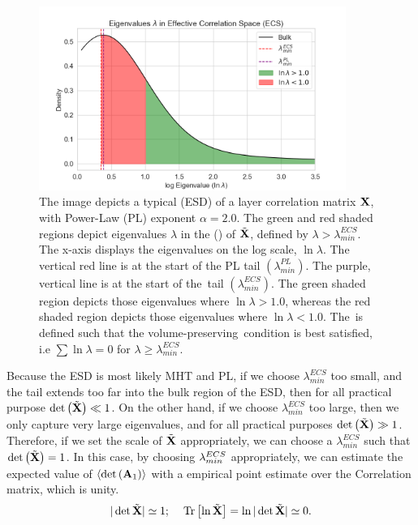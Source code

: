 \begin{figure}[t]
  \begin{center}
  \includegraphics[width=10cm]{./img/ECS_space.png}
  \caption{The image depicts a typical
    \EmpiricalSpectralDensity (ESD) of a layer correlation matrix $\mathbf{X}$, with \WW Power-Law (PL) exponent
    $\alpha=2.0$.%
    The green and red shaded regions depict
    eigenvalues $\lambda$ in the \EffectiveCorrelationSpace (\ECS) of $\tilde{\mathbf{X}}$, defined by $\lambda>\lambda_{min}^{ECS}$.
    The x-axis displays the eigenvalues on the log scale, $\ln\lambda$.
    The vertical red line is at the start of the PL tail  $(\lambda_{min}^{PL})$.
    The purple, vertical line is at the start of the~\ECS tail  $(\lambda_{min}^{ECS})$.
    The green shaded region depicts those eigenvalues where $\ln\lambda>1.0$,
    whereas the red shaded region depicts those eigenvalues where $\ln\lambda<1.0$.
    The~\ECS is defined such that the volume-preserving~\TRACELOG condition is best satisfied, i.e $\sum\ln\lambda= 0$ for $\lambda\ge\lambda_{min}^{ECS}$.
    }
  \end{center}
  \label{fig:ECS_space}
\end{figure}

Because the \Teacher ESD is most likely MHT and PL, 
if we choose $\lambda_{min}^{ECS}$ too small, and the tail extends too far into the bulk region of the ESD,
then for all practical purpose $\mbox{}{\text{det}}\left(\tilde{\mathbf{X}}\right)\ll 1$.
On the other hand, if we choose $\lambda_{min}^{ECS}$ too large,
then we only capture very large eigenvalues, and for all practical purposes $\mbox{}{\text{det}}\left(\tilde{\mathbf{X}}\right) \gg 1$.
Therefore, if we set the scale of $\tilde{\mathbf{X}}$ appropriately, we can choose a $\lambda_{min}^{ECS}$ such that $\mbox{}{\text{det}}\left(\tilde{\mathbf{X}}\right)=1$.
In this case, by choosing $\lambda^{ECS}_{min}$ appropriately, we can estimate the expected value of
$\langle\mbox{}{\text{det}}\left(\mathbf{A}_{1}\right)\rangle$  with a empirical point estimate over the \Teacher Correlation matrix, which is unity.
\begin{equation}
\label{eqn:detX}
\vert\det\tilde{\mathbf{X}}\vert \simeq 1 ; \quad \mbox{}\operatorname{Tr}\left[ \ln\tilde{\mathbf{X}} \right] = \ln\vert\det\tilde{\mathbf{X}}\vert \simeq 0  .
\end{equation} 

